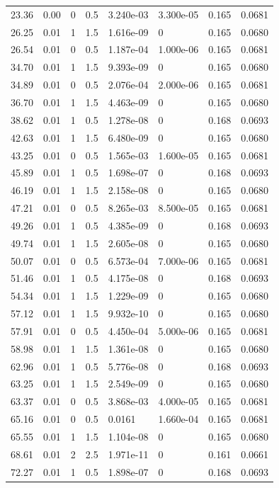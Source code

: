 \documentclass[preview]{standalone}
\begin{document}
{{\begin{tabular}{L{1.2cm}C{1.2cm} C{0.3cm}C{0.5cm} C{1.4cm}C{1.4cm} C{1.4cm}C{1.4cm}}
  23.36  &  0.00  & 0     & 0.5 &  3.240e-03  & 3.300e-05  & 0.165 &  0.0681   \\ 
  26.25  &  0.01  & 1     & 1.5 &  1.616e-09  & 0  & 0.165 &  0.0680   \\ 
  26.54  &  0.01  & 0     & 0.5 &  1.187e-04  & 1.000e-06  & 0.165 &  0.0681   \\ 
  34.70  &  0.01  & 1     & 1.5 &  9.393e-09  & 0  & 0.165 &  0.0680   \\ 
  34.89  &  0.01  & 0     & 0.5 &  2.076e-04  & 2.000e-06  & 0.165 &  0.0681   \\ 
  36.70  &  0.01  & 1     & 1.5 &  4.463e-09  & 0  & 0.165 &  0.0680   \\ 
  38.62  &  0.01  & 1     & 0.5 &  1.278e-08  & 0  & 0.168 &  0.0693   \\ 
  42.63  &  0.01  & 1     & 1.5 &  6.480e-09  & 0  & 0.165 &  0.0680   \\ 
  43.25  &  0.01  & 0     & 0.5 &  1.565e-03  & 1.600e-05  & 0.165 &  0.0681   \\ 
  45.89  &  0.01  & 1     & 0.5 &  1.698e-07  & 0  & 0.168 &  0.0693   \\ 
  46.19  &  0.01  & 1     & 1.5 &  2.158e-08  & 0  & 0.165 &  0.0680   \\ 
  47.21  &  0.01  & 0     & 0.5 &  8.265e-03  & 8.500e-05  & 0.165 &  0.0681   \\ 
  49.26  &  0.01  & 1     & 0.5 &  4.385e-09  & 0  & 0.168 &  0.0693   \\ 
  49.74  &  0.01  & 1     & 1.5 &  2.605e-08  & 0  & 0.165 &  0.0680   \\ 
  50.07  &  0.01  & 0     & 0.5 &  6.573e-04  & 7.000e-06  & 0.165 &  0.0681   \\ 
  51.46  &  0.01  & 1     & 0.5 &  4.175e-08  & 0  & 0.168 &  0.0693   \\ 
  54.34  &  0.01  & 1     & 1.5 &  1.229e-09  & 0  & 0.165 &  0.0680   \\ 
  57.12  &  0.01  & 1     & 1.5 &  9.932e-10  & 0  & 0.165 &  0.0680   \\ 
  57.91  &  0.01  & 0     & 0.5 &  4.450e-04  & 5.000e-06  & 0.165 &  0.0681   \\ 
  58.98  &  0.01  & 1     & 1.5 &  1.361e-08  & 0  & 0.165 &  0.0680   \\ 
  62.96  &  0.01  & 1     & 0.5 &  5.776e-08  & 0  & 0.168 &  0.0693   \\ 
  63.25  &  0.01  & 1     & 1.5 &  2.549e-09  & 0  & 0.165 &  0.0680   \\ 
  63.37  &  0.01  & 0     & 0.5 &  3.868e-03  & 4.000e-05  & 0.165 &  0.0681   \\ 
  65.16  &  0.01  & 0     & 0.5 &  0.0161  & 1.660e-04  & 0.165 &  0.0681   \\ 
  65.55  &  0.01  & 1     & 1.5 &  1.104e-08  & 0  & 0.165 &  0.0680   \\ 
  68.61  &  0.01  & 2     & 2.5 &  1.971e-11  & 0  & 0.161 &  0.0661   \\ 
  72.27  &  0.01  & 1     & 0.5 &  1.898e-07  & 0  & 0.168 &  0.0693   \\ 
\hline 
\end{tabular} 

}}
\end{document}
